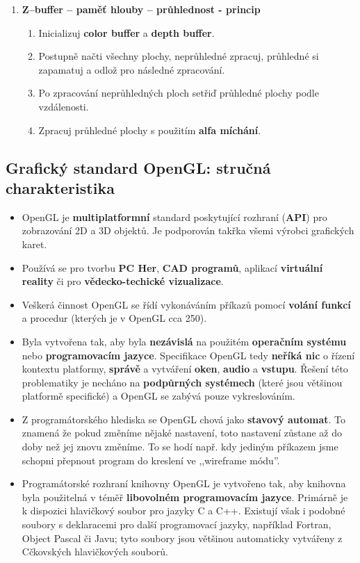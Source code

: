 \begin{enumerate}
	\item \textbf{Z--buffer -- paměť hlouby -- průhlednost - princip}
	\begin{enumerate}
		\item Inicializuj \textbf{color buffer} a \textbf{depth buffer}.
		\item Postupně načti všechny plochy, neprůhledné zpracuj, průhledné si zapamatuj a odlož pro následné zpracování.
		\item Po zpracování neprůhledných ploch setřiď průhledné plochy podle vzdálenosti.
		\item Zpracuj průhledné plochy s použitím \textbf{alfa míchání}.
	\end{enumerate}
\end{enumerate}
\subsection{Grafický standard OpenGL: stručná charakteristika}
\begin{itemize}
\item OpenGL je \textbf{multiplatformní} standard poskytující rozhraní (\textbf{API}) pro zobrazování 2D a 3D objektů. Je podporován takřka všemi výrobci grafických karet.
\item Používá se pro tvorbu \textbf{PC Her}, \textbf{CAD programů}, aplikací \textbf{virtuální reality} či pro  \textbf{vědecko-techické vizualizace}.
\item Veškerá činnost OpenGL se řídí vykonáváním příkazů pomocí \textbf{volání funkcí} a procedur (kterých je v OpenGL cca 250).
\item Byla vytvořena tak, aby byla \textbf{nezávislá} na použitém \textbf{operačním systému} nebo \textbf{programovacím jazyce}. Specifikace OpenGL tedy \textbf{neříká nic} o řízení kontextu platformy, \textbf{správě} a vytváření \textbf{oken}, \textbf{audio} a \textbf{vstupu}. Řešení této problematiky je necháno na \textbf{podpůrných systémech} (které jsou většinou platformě specifické) a OpenGL se zabývá pouze vykreslováním.
\item Z programátorského hlediska se OpenGL chová jako \textbf{stavový automat}. To znamená že pokud změníme nějaké nastavení, toto nastavení zůstane až do doby než jej znovu změníme. To se hodí např. kdy jediným příkazem jsme schopni přepnout program do kreslení ve ,,wireframe módu''.
\item Programátorské rozhraní knihovny OpenGL je vytvořeno tak, aby knihovna byla použitelná v téměř \textbf{libovolném programovacím jazyce}. Primárně je k dispozici hlavičkový soubor pro jazyky C a C++. Existují však i podobné soubory s deklaracemi pro další programovací jazyky, například Fortran, Object Pascal či Javu; tyto soubory jsou většinou automaticky vytvářeny z Cčkovských hlavičkových souborů.
\end{itemize}

